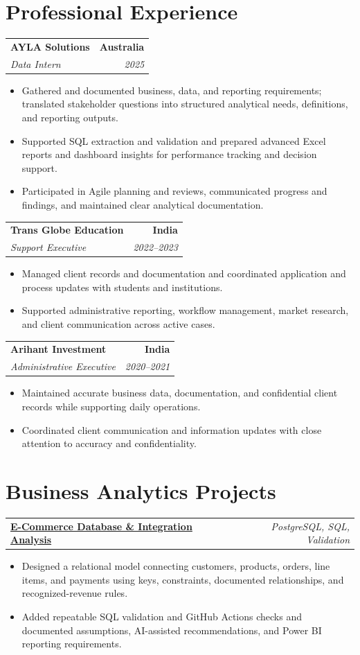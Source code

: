 \documentclass[letterpaper,10pt]{article}
\makeatletter
\newcommand{\role}[4]{%
  \begin{tabularx}{\textwidth}{@{}Xr@{}}
    \textbf{#1} & \textbf{#2} \\
    \textit{#3} & \textit{#4}
  \end{tabularx}\vspace{-1pt}
}
\newcommand{\project}[2]{%
  \begin{tabularx}{\textwidth}{@{}Xr@{}}
    \textbf{#1} & \textit{#2}
  \end{tabularx}\vspace{-1pt}
}
\makeatother
\begin{document}
\section{Professional Experience}
\role{AYLA Solutions}{Australia}{Data Intern}{2025}
\begin{itemize}
  \item Gathered and documented business, data, and reporting requirements; translated stakeholder questions into structured analytical needs, definitions, and reporting outputs.
  \item Supported SQL extraction and validation and prepared advanced Excel reports and dashboard insights for performance tracking and decision support.
  \item Participated in Agile planning and reviews, communicated progress and findings, and maintained clear analytical documentation.
\end{itemize}
\vspace{1pt}

\role{Trans Globe Education}{India}{Support Executive}{2022--2023}
\begin{itemize}
  \item Managed client records and documentation and coordinated application and process updates with students and institutions.
  \item Supported administrative reporting, workflow management, market research, and client communication across active cases.
\end{itemize}
\vspace{1pt}

\role{Arihant Investment}{India}{Administrative Executive}{2020--2021}
\begin{itemize}
  \item Maintained accurate business data, documentation, and confidential client records while supporting daily operations.
  \item Coordinated client communication and information updates with close attention to accuracy and confidentiality.
\end{itemize}

\section{Business Analytics Projects}
\project{\href{https://github.com/jainalimehta/Ecommerce-Sales-Analytics}{E-Commerce Database \& Integration Analysis}}{PostgreSQL, SQL, Validation}
\begin{itemize}
  \item Designed a relational model connecting customers, products, orders, line items, and payments using keys, constraints, documented relationships, and recognized-revenue rules.
  \item Added repeatable SQL validation and GitHub Actions checks and documented assumptions, AI-assisted recommendations, and Power BI reporting requirements.
\end{itemize}
\vspace{1pt}
\end{document}
